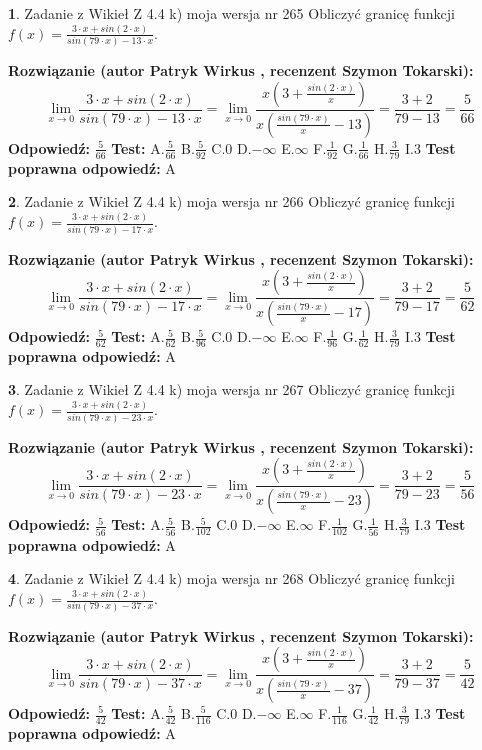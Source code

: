 \documentclass[12pt, a4paper]{article}
\theoremstyle{definition} %
\newtheorem{zad}{}
\newcommand{\zadStart}[1]{\begin{zad}#1\newline}
\newcommand{\zadStop}{\end{zad}}
\newcommand{\rozwStart}[2]{\noindent \textbf{Rozwiązanie (autor #1 , recenzent #2): }\newline}
\newcommand{\rozwStop}{\newline}
\newcommand{\odpStart}{\noindent \textbf{Odpowiedź:}\newline}
\newcommand{\odpStop}{\newline}
\newcommand{\testStart}{\noindent \textbf{Test:}\newline}
\newcommand{\testStop}{\newline}
\newcommand{\kluczStart}{\noindent \textbf{Test poprawna odpowiedź:}\newline}
\newcommand{\kluczStop}{\newline}
\begin{document}
\zadStart{Zadanie z Wikieł Z 4.4 k) moja wersja nr 265}
Obliczyć granicę funkcji $f(x)=\frac{3\cdot x +sin(2\cdot x)}{sin(79\cdot x) -13\cdot x}$.
\zadStop
\rozwStart{Patryk Wirkus}{Szymon Tokarski}
$$\lim\limits_{x\to 0}\frac{3\cdot x +sin(2\cdot x)}{sin(79\cdot x) -13\cdot x}
=\lim\limits_{x\to 0}\frac{x(3+\frac{sin(2\cdot x)}{x})}{x(\frac{sin(79\cdot x)}{x}-13)}
=\frac{3+2}{79-13} = \frac{5}{66}$$
\rozwStop
\odpStart
$\frac{5}{66}$
\odpStop
\testStart
A.$\frac{5}{66}$
B.$\frac{5}{92}$
C.$0$
D.$-\infty$
E.$\infty$
F.$\frac{1}{92}$
G.$\frac{1}{66}$
H.$\frac{3}{79}$
I.$3$
\testStop
\kluczStart
A
\kluczStop



\zadStart{Zadanie z Wikieł Z 4.4 k) moja wersja nr 266}
Obliczyć granicę funkcji $f(x)=\frac{3\cdot x +sin(2\cdot x)}{sin(79\cdot x) -17\cdot x}$.
\zadStop
\rozwStart{Patryk Wirkus}{Szymon Tokarski}
$$\lim\limits_{x\to 0}\frac{3\cdot x +sin(2\cdot x)}{sin(79\cdot x) -17\cdot x}
=\lim\limits_{x\to 0}\frac{x(3+\frac{sin(2\cdot x)}{x})}{x(\frac{sin(79\cdot x)}{x}-17)}
=\frac{3+2}{79-17} = \frac{5}{62}$$
\rozwStop
\odpStart
$\frac{5}{62}$
\odpStop
\testStart
A.$\frac{5}{62}$
B.$\frac{5}{96}$
C.$0$
D.$-\infty$
E.$\infty$
F.$\frac{1}{96}$
G.$\frac{1}{62}$
H.$\frac{3}{79}$
I.$3$
\testStop
\kluczStart
A
\kluczStop



\zadStart{Zadanie z Wikieł Z 4.4 k) moja wersja nr 267}
Obliczyć granicę funkcji $f(x)=\frac{3\cdot x +sin(2\cdot x)}{sin(79\cdot x) -23\cdot x}$.
\zadStop
\rozwStart{Patryk Wirkus}{Szymon Tokarski}
$$\lim\limits_{x\to 0}\frac{3\cdot x +sin(2\cdot x)}{sin(79\cdot x) -23\cdot x}
=\lim\limits_{x\to 0}\frac{x(3+\frac{sin(2\cdot x)}{x})}{x(\frac{sin(79\cdot x)}{x}-23)}
=\frac{3+2}{79-23} = \frac{5}{56}$$
\rozwStop
\odpStart
$\frac{5}{56}$
\odpStop
\testStart
A.$\frac{5}{56}$
B.$\frac{5}{102}$
C.$0$
D.$-\infty$
E.$\infty$
F.$\frac{1}{102}$
G.$\frac{1}{56}$
H.$\frac{3}{79}$
I.$3$
\testStop
\kluczStart
A
\kluczStop



\zadStart{Zadanie z Wikieł Z 4.4 k) moja wersja nr 268}
Obliczyć granicę funkcji $f(x)=\frac{3\cdot x +sin(2\cdot x)}{sin(79\cdot x) -37\cdot x}$.
\zadStop
\rozwStart{Patryk Wirkus}{Szymon Tokarski}
$$\lim\limits_{x\to 0}\frac{3\cdot x +sin(2\cdot x)}{sin(79\cdot x) -37\cdot x}
=\lim\limits_{x\to 0}\frac{x(3+\frac{sin(2\cdot x)}{x})}{x(\frac{sin(79\cdot x)}{x}-37)}
=\frac{3+2}{79-37} = \frac{5}{42}$$
\rozwStop
\odpStart
$\frac{5}{42}$
\odpStop
\testStart
A.$\frac{5}{42}$
B.$\frac{5}{116}$
C.$0$
D.$-\infty$
E.$\infty$
F.$\frac{1}{116}$
G.$\frac{1}{42}$
H.$\frac{3}{79}$
I.$3$
\testStop
\kluczStart
A
\kluczStop
\end{document}
